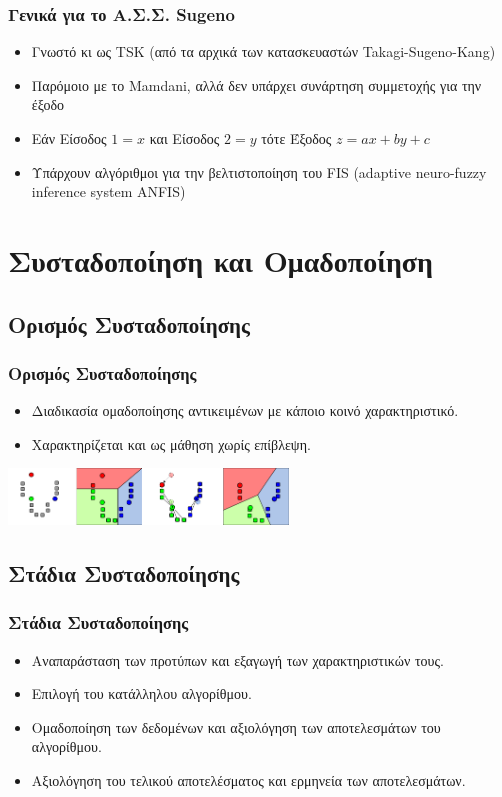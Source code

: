 \documentclass[xetex,serif,mathserif,14pt]{beamer}
\begin{document}
\begin{frame}
\frametitle{Γενικά για το Α.Σ.Σ. Sugeno}
\begin{itemize}
  \item Γνωστό κι ως TSK (από τα αρχικά των κατασκευαστών Takagi-Sugeno-Kang)\pause
  \item Παρόμοιο με το Mamdani, αλλά δεν υπάρχει συνάρτηση συμμετοχής για την έξοδο\pause
  \item Εάν Είσοδος $1 = x$ και Είσοδος $2 = y$ τότε Έξοδος $z = ax + by + c$\pause
  \item Υπάρχουν αλγόριθμοι για την βελτιστοποίηση του FIS (adaptive neuro-fuzzy inference system \textendash ANFIS)
\end{itemize}
\end{frame}


\section{Συσταδοποίηση και Ομαδοποίηση}

\subsection{Ορισμός Συσταδοποίησης}

\begin{frame}
\frametitle{Ορισμός Συσταδοποίησης}
\begin{itemize}
  \item Διαδικασία ομαδοποίησης αντικειμένων με κάποιο κοινό χαρακτηριστικό.\pause
  \item Χαρακτηρίζεται και ως μάθηση χωρίς επίβλεψη.
\end{itemize}
\centering
{\includegraphics[height=1.5cm]{images/kmeans.png}}
\end{frame}

\subsection{Στάδια Συσταδοποίησης}

\begin{frame}
\frametitle{Στάδια Συσταδοποίησης}
\begin{itemize}
  \item Αναπαράσταση των προτύπων και εξαγωγή των χαρακτηριστικών τους.\pause
  \item Επιλογή  του  κατάλληλου  αλγορίθμου.\pause
  \item Ομαδοποίηση των δεδομένων και αξιολόγηση των αποτελεσμάτων του αλγορίθμου.\pause
  \item Αξιολόγηση του τελικού αποτελέσματος και ερμηνεία των αποτελεσμάτων.
\end{itemize}
\end{frame}
\end{document}
